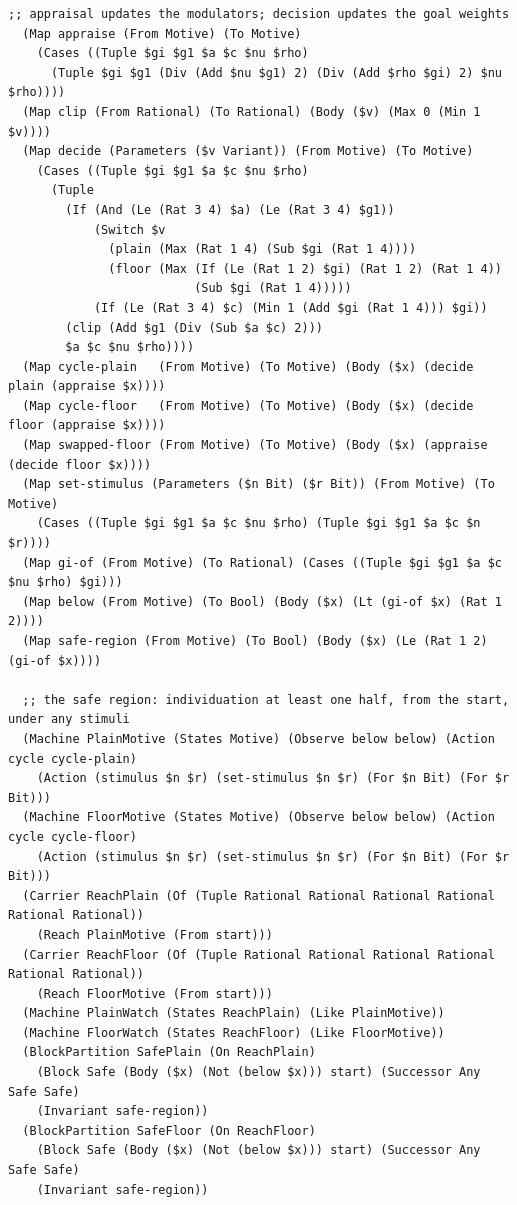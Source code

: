 \documentclass[11pt]{article}
\theoremstyle{definition}
\theoremstyle{plain}
\begin{document}
\begin{lstlisting}[style=mettafull]
  ;; appraisal updates the modulators; decision updates the goal weights
  (Map appraise (From Motive) (To Motive)
    (Cases ((Tuple $gi $g1 $a $c $nu $rho)
      (Tuple $gi $g1 (Div (Add $nu $g1) 2) (Div (Add $rho $gi) 2) $nu $rho))))
  (Map clip (From Rational) (To Rational) (Body ($v) (Max 0 (Min 1 $v))))
  (Map decide (Parameters ($v Variant)) (From Motive) (To Motive)
    (Cases ((Tuple $gi $g1 $a $c $nu $rho)
      (Tuple
        (If (And (Le (Rat 3 4) $a) (Le (Rat 3 4) $g1))
            (Switch $v
              (plain (Max (Rat 1 4) (Sub $gi (Rat 1 4))))
              (floor (Max (If (Le (Rat 1 2) $gi) (Rat 1 2) (Rat 1 4))
                          (Sub $gi (Rat 1 4)))))
            (If (Le (Rat 3 4) $c) (Min 1 (Add $gi (Rat 1 4))) $gi))
        (clip (Add $g1 (Div (Sub $a $c) 2)))
        $a $c $nu $rho))))
  (Map cycle-plain   (From Motive) (To Motive) (Body ($x) (decide plain (appraise $x))))
  (Map cycle-floor   (From Motive) (To Motive) (Body ($x) (decide floor (appraise $x))))
  (Map swapped-floor (From Motive) (To Motive) (Body ($x) (appraise (decide floor $x))))
  (Map set-stimulus (Parameters ($n Bit) ($r Bit)) (From Motive) (To Motive)
    (Cases ((Tuple $gi $g1 $a $c $nu $rho) (Tuple $gi $g1 $a $c $n $r))))
  (Map gi-of (From Motive) (To Rational) (Cases ((Tuple $gi $g1 $a $c $nu $rho) $gi)))
  (Map below (From Motive) (To Bool) (Body ($x) (Lt (gi-of $x) (Rat 1 2))))
  (Map safe-region (From Motive) (To Bool) (Body ($x) (Le (Rat 1 2) (gi-of $x))))

  ;; the safe region: individuation at least one half, from the start, under any stimuli
  (Machine PlainMotive (States Motive) (Observe below below) (Action cycle cycle-plain)
    (Action (stimulus $n $r) (set-stimulus $n $r) (For $n Bit) (For $r Bit)))
  (Machine FloorMotive (States Motive) (Observe below below) (Action cycle cycle-floor)
    (Action (stimulus $n $r) (set-stimulus $n $r) (For $n Bit) (For $r Bit)))
  (Carrier ReachPlain (Of (Tuple Rational Rational Rational Rational Rational Rational))
    (Reach PlainMotive (From start)))
  (Carrier ReachFloor (Of (Tuple Rational Rational Rational Rational Rational Rational))
    (Reach FloorMotive (From start)))
  (Machine PlainWatch (States ReachPlain) (Like PlainMotive))
  (Machine FloorWatch (States ReachFloor) (Like FloorMotive))
  (BlockPartition SafePlain (On ReachPlain)
    (Block Safe (Body ($x) (Not (below $x))) start) (Successor Any Safe Safe)
    (Invariant safe-region))
  (BlockPartition SafeFloor (On ReachFloor)
    (Block Safe (Body ($x) (Not (below $x))) start) (Successor Any Safe Safe)
    (Invariant safe-region))


\end{lstlisting}
\end{document}
